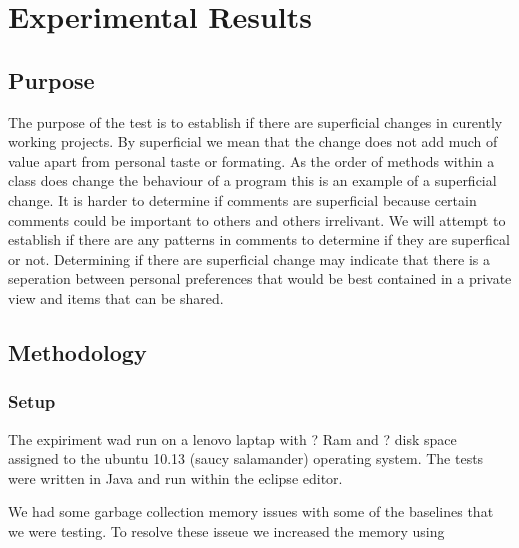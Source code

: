 
\chapter{Experimental Results}

\section{Purpose}
The purpose of the test is to establish if there are superficial changes in curently working projects.  By superficial we mean that the change does not add   much of value apart from personal taste or formating.  As the order of methods within a class does change the behaviour of a program this is an example of a superficial change.  It is harder to determine if comments are superficial because certain comments could be important to others and others irrelivant. We will attempt to establish if there are any patterns in comments to determine if they are superfical or not.  Determining if there are superficial change may indicate that there is a seperation between personal preferences that would be best contained in a private view and items that can be shared.    

\section{Methodology}
\subsection{Setup}
The expiriment wad run on a lenovo laptap with ? Ram and ? disk space assigned to the ubuntu 10.13 (saucy salamander) operating system.  The tests were written in Java and run within the eclipse editor.


We had some garbage collection memory issues with some of the baselines that we were testing. To resolve these isseue we increased the memory using
 

% 
% 
% 
% 
% 
% 
% 

